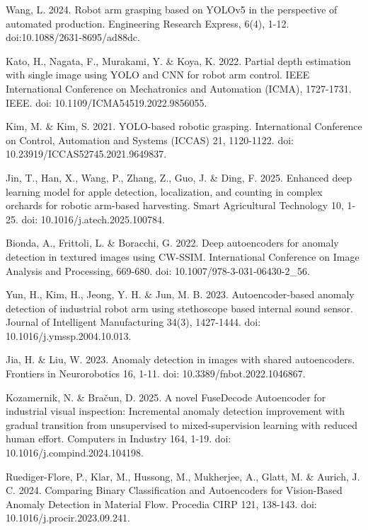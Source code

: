 \begin{thebibliography}{9}
  Wang, L. 2024. Robot arm grasping based on YOLOv5 in the
  perspective of automated production. Engineering Research Express,
  6(4), 1-12. doi:10.1088/2631-8695/ad88dc.

  Kato, H., Nagata, F., Murakami, Y. \& Koya, K. 2022. Partial depth
  estimation with single image using YOLO and CNN for robot arm
  control. IEEE International Conference on Mechatronics and
  Automation (ICMA), 1727-1731. IEEE. doi: 10.1109/ICMA54519.2022.9856055.

  Kim, M. \& Kim, S. 2021. YOLO-based robotic grasping. International
  Conference on Control, Automation and
  Systems (ICCAS) 21, 1120-1122. doi: 10.23919/ICCAS52745.2021.9649837.

  Jin, T., Han, X., Wang, P., Zhang, Z., Guo, J. \& Ding, F. 2025.
  Enhanced deep learning model for apple detection, localization, and
  counting in complex orchards for robotic arm-based harvesting.
  Smart Agricultural Technology 10, 1-25. doi: 10.1016/j.atech.2025.100784.

  Bionda, A., Frittoli, L. \& Boracchi, G. 2022. Deep
  autoencoders for anomaly detection in textured images using
  CW-SSIM. International Conference on Image Analysis and
  Processing, 669-680. doi: 10.1007/978-3-031-06430-2\_56.

  Yun, H., Kim, H., Jeong, Y. H. \& Jun, M. B. 2023.
  Autoencoder-based anomaly detection of industrial robot arm using
  stethoscope based internal sound sensor. Journal of Intelligent
  Manufacturing 34(3), 1427-1444. doi: 10.1016/j.ymssp.2004.10.013.

  Jia, H. \& Liu, W. 2023. Anomaly detection in images with shared
  autoencoders. Frontiers in Neurorobotics 16, 1-11. doi:
  10.3389/fnbot.2022.1046867.

  Kozamernik, N. \& Bračun, D. 2025. A novel FuseDecode Autoencoder
  for industrial visual inspection: Incremental anomaly detection
  improvement with gradual transition from unsupervised to
  mixed-supervision learning with reduced human effort. Computers in
  Industry 164, 1-19. doi: 10.1016/j.compind.2024.104198.

  Ruediger-Flore, P., Klar, M., Hussong, M., Mukherjee, A., Glatt,
  M. \& Aurich, J. C. 2024. Comparing Binary Classification and
  Autoencoders for Vision-Based Anomaly Detection in Material Flow.
  Procedia CIRP 121, 138-143. doi: 10.1016/j.procir.2023.09.241.

\end{thebibliography}
